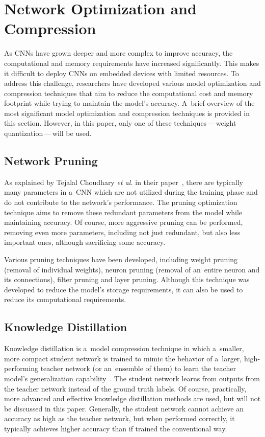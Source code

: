\section{Network Optimization and Compression}

As CNNs have grown deeper and more complex to improve accuracy, the
computational and memory requirements have increased significantly. This makes
it difficult to deploy CNNs on embedded devices with limited resources. To
address this challenge, researchers have developed various model optimization
and compression techniques that aim to reduce the computational cost and memory
footprint while trying to maintain the model's accuracy. A~brief overview of the
most significant model optimization and compression techniques is provided in
this section. However, in this paper, only one of these techniques\,---\,weight
quantization\,---\,will be used.


\subsection{Network Pruning}

As explained by Tejalal Choudhary \textit{et al.} in their
paper~\cite{Choudhary2020}, there are typically many parameters in a~CNN which
are not utilized during the training phase and do not contribute to the
network's performance. The pruning optimization technique aims to
remove these redundant parameters from the model while maintaining accuracy. Of
course, more aggressive pruning can be performed, removing even more parameters,
including not just redundant, but also less important ones, although
sacrificing some accuracy.

Various pruning techniques have been developed, including weight pruning
(removal of individual weights), neuron pruning (removal of an~entire neuron and
its connections), filter pruning and layer pruning. Although this technique was
developed to reduce the model's storage requirements, it can also be used to
reduce its computational requirements.


\subsection{Knowledge Distillation}

Knowledge distillation is a~model compression technique in which a~smaller, more
compact student network is trained to mimic the behavior of a~larger,
high-performing teacher network (or an~ensemble of them) to learn the teacher
model's generalization capability~\cite{Gou2021}. The student network learns
from outputs from the teacher network instead of the ground truth labels. Of
course, practically, more advanced and effective knowledge distillation methods
are used, but will not be discussed in this paper. Generally, the student
network cannot achieve an accuracy as high as the teacher network, but when
performed correctly, it typically achieves higher accuracy than if trained the
conventional way.


